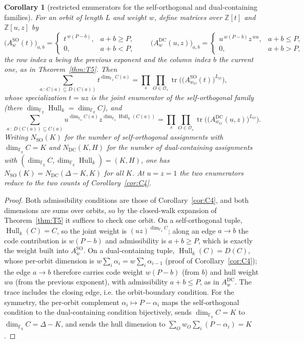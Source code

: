 \documentclass[11pt]{article}
\newtheorem{corollary}[theorem]{Corollary}
\theoremstyle{definition}
\theoremstyle{remark}
\newcommand{\Fq}{\mathbb{F}_q}
\newcommand{\Z}{\mathbb{Z}}
\newcommand{\Hull}{\operatorname{Hull}}
\newcommand{\tr}{\operatorname{tr}}
\begin{document}
\begin{corollary}[restricted enumerators for the self-orthogonal and
dual-containing families]\label{cor:restricted}
For an orbit of length \(L\) and weight \(w\), define matrices over
\(\Z[t]\) and \(\Z[u,z]\) by
\[
\big(A^{\mathrm{SO}}_w(t)\big)_{a,b} =
\begin{cases} t^{\,w(P-b)}, & a + b \ge P, \\ 0, & a + b < P,
\end{cases}
\qquad
\big(A^{\mathrm{DC}}_w(u,z)\big)_{a,b} =
\begin{cases} u^{\,w(P-b)} z^{\,wa}, & a + b \le P, \\ 0, & a + b > P,
\end{cases}
\]
the row index \(a\) being the previous exponent and the column index
\(b\) the current one, as in Theorem~\ref{thm:T5}. Then
\[
\sum_{a \,:\, C(a) \subseteq D(C(a))} t^{\dim_{\Fq} C(a)}
= \prod_{s} \prod_{O \in \mathcal{O}_s}
\tr\!\Big(\big(A^{\mathrm{SO}}_{w_O}(t)\big)^{L_O}\Big),
\]
whose specialization \(t = uz\) is the joint enumerator of the
self-orthogonal family (there \(\dim_{\Fq} \Hull_k = \dim_{\Fq} C\)), and
\[
\sum_{a \,:\, D(C(a)) \subseteq C(a)}
u^{\dim_{\Fq} C(a)} z^{\dim_{\Fq} \Hull_k(C(a))}
= \prod_{s} \prod_{O \in \mathcal{O}_s}
\tr\!\Big(\big(A^{\mathrm{DC}}_{w_O}(u,z)\big)^{L_O}\Big).
\]
Writing \(N_{\mathrm{SO}}(K)\) for the number of self-orthogonal
assignments with \(\dim_{\Fq} C = K\) and \(N_{\mathrm{DC}}(K,H)\) for
the number of dual-containing assignments with
\((\dim_{\Fq} C, \dim_{\Fq} \Hull_k) = (K,H)\), one has
\(N_{\mathrm{SO}}(K) = N_{\mathrm{DC}}(\Delta - K, K)\) for all \(K\).
At \(u = z = 1\) the two enumerators reduce to the two counts of
Corollary~\ref{cor:C4}.
\end{corollary}

\begin{proof}
Both admissibility conditions are those of Corollary~\ref{cor:C4}, and
both dimensions are sums over orbits, so by the closed-walk expansion of
Theorem~\ref{thm:T5} it suffices to check one orbit. On a
self-orthogonal tuple, \(\Hull_k(C) = C\), so the joint weight is
\((uz)^{\dim_{\Fq} C}\); along an edge \(a \to b\) the code contribution
is \(w(P-b)\) and admissibility is \(a+b \ge P\), which is exactly the
weight built into \(A^{\mathrm{SO}}_w\). On a dual-containing tuple,
\(\Hull_k(C) = D(C)\), whose per-orbit dimension is
\(w \sum_i \alpha_i = w \sum_i \alpha_{i-1}\) (proof of
Corollary~\ref{cor:C4}); the edge \(a \to b\) therefore carries code
weight \(w(P-b)\) (from \(b\)) and hull weight \(wa\) (from the previous
exponent), with admissibility \(a + b \le P\), as in
\(A^{\mathrm{DC}}_w\). The trace includes the closing edge, i.e. the
orbit-boundary condition. For the symmetry, the per-orbit complement
\(\alpha_i \mapsto P - \alpha_i\) maps the self-orthogonal condition to
the dual-containing condition bijectively, sends \(\dim_{\Fq} C = K\) to
\(\dim_{\Fq} C = \Delta - K\), and sends the hull dimension to
\(\sum_O w_O \sum_i (P - \alpha_i) = K\).
\end{proof}
\end{document}
